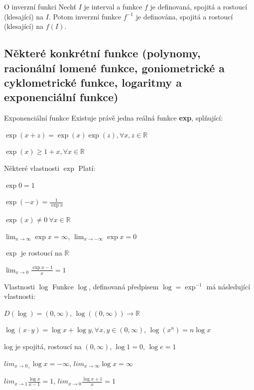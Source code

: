 \begin{vetaN}{O inverzní funkci}
Nechť $I$ je interval a funkce $f$ je definovaná, spojitá a rostoucí (klesající) na $I$. Potom inverzní funkce $f^{-1}$ je definována, spojitá a rostoucí (klesající) na $f(I)$.
\end{vetaN}

\subsection{Některé konkrétní funkce (polynomy, racionální lomené funkce, goniometrické a cyklometrické funkce, logaritmy a exponenciální funkce)}

\begin{vetaN}{Exponenciální funkce}
Existuje právě jedna reálná funkce \textbf{exp}, splňující:
\begin{pitemize}
	\item $\exp(x+z)=\exp(x) \exp(z), \forall x,z \in \mathbb{R}$
	\item $\exp(x) \ge 1+x, \forall x \in \mathbb{R}$
\end{pitemize}
\end{vetaN}

\begin{poznamkaN}{Některé vlastnosti $\exp$}
Platí:
\begin{pitemize}
    \item $\exp 0=1$
    \item $\exp (-x) = \frac{1}{\exp x}$
    \item $\exp (x) \neq 0\ \forall x\in \mathbb{R}$
    \item $\lim_{x\to\infty}\exp x=\infty$, $\lim_{x\to-\infty}\exp x=0$
    \item $\exp$ je rostoucí na $\mathbb{R}$
    \item $\lim_{x\to 0}\frac{\exp x - 1}{x}=1$
\end{pitemize}
\end{poznamkaN}

\begin{vetaN}{Vlastnosti $\log$}
Funkce $\log$, definovaná předpisem $\log=\exp^{-1}$ má následující vlastnosti:
\begin{pitemize}
	\item $D(\log)=(0, \infty)$, $\log ((0, \infty)) \rightarrow \mathbb{R}$
	\item $\log(x\cdot y) = \log x + \log y, \forall x, y \in (0, \infty)$, $\log(x^n)=n\log x$
	\item log je spojitá, rostoucí na $(0, \infty)$, $\log 1=0$, $\log e = 1$
	\item $lim_{x \rightarrow 0_{+}} \log x = - \infty$, $lim_{x \rightarrow \infty} \log x = \infty$
	\item $lim_{x \rightarrow 1} \frac{\log x}{x-1} = 1$, $lim_{x \rightarrow 0} \frac{\log x+1}{x} = 1$
\end{pitemize}
\end{vetaN}

